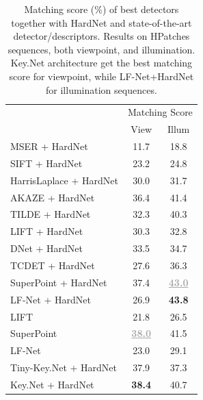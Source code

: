 \begin{table}[!tbh]
\vspace{-0.10cm}
\begin{center}
\begin{tabular}{lcc}
\hline
\noalign{\smallskip}
\multicolumn{1}{c}{} & \multicolumn{2}{c}{Matching Score} \\ 
\cline{2-3} \noalign{\smallskip}
\multicolumn{1}{c}{} & \multicolumn{1}{c}{View} & \multicolumn{1}{c}{Illum} \\
\noalign{\smallskip}
\hline
\noalign{\smallskip}
MSER \cite{MSER} + HardNet \cite{Mishchuk_Mishkin_NIPS17}   & 11.7 & 18.8 \\
SIFT \cite{SIFT} + HardNet \cite{Mishchuk_Mishkin_NIPS17}   & 23.2 & 24.8 \\
HarrisLaplace \cite{HarrisLaplace} + HardNet \cite{Mishchuk_Mishkin_NIPS17} & 30.0 & 31.7 \\
AKAZE \cite{AKAZE} + HardNet \cite{Mishchuk_Mishkin_NIPS17} & 36.4 & 41.4 \\
TILDE \cite{TILDE} + HardNet \cite{Mishchuk_Mishkin_NIPS17} & 32.3 & 40.3 \\
LIFT \cite{LIFT} + HardNet \cite{Mishchuk_Mishkin_NIPS17} & 30.3 & 32.8 \\
DNet \cite{Karel_Vedaldi_ECCV_16} + HardNet \cite{Mishchuk_Mishkin_NIPS17} & 33.5 & 34.7 \\
TCDET \cite{Zhang_Felix_CVPR_17} + HardNet \cite{Mishchuk_Mishkin_NIPS17} & 27.6 & 36.3 \\
SuperPoint \cite{detone2017superpoint} + HardNet \cite{Mishchuk_Mishkin_NIPS17} & 37.4 & \textbf{\textcolor{darkgray}{\underline{43.0}}} \\
LF-Net \cite{OnoSerra18} + HardNet \cite{Mishchuk_Mishkin_NIPS17} & 26.9 & \textbf{43.8} \\
\noalign{\smallskip}
\hline
\noalign{\smallskip}
LIFT \cite{LIFT} & 21.8 & 26.5 \\
SuperPoint \cite{detone2017superpoint} & \textbf{\textcolor{darkgray}{\underline{38.0}}} & 41.5 \\
LF-Net \cite{OnoSerra18} & 23.0 & 29.1 \\
\noalign{\smallskip}
\hline
\noalign{\smallskip}
Tiny-Key.Net + HardNet \cite{Mishchuk_Mishkin_NIPS17} & 37.9 & 37.3 \\
Key.Net + HardNet \cite{Mishchuk_Mishkin_NIPS17}      & \textbf{38.4} & 40.7 \\
\end{tabular}
\caption{Matching score (\%) of best detectors together with HardNet and state-of-the-art detector/descriptors. Results on HPatches sequences, both viewpoint, and illumination. Key.Net architecture get the best matching score for viewpoint, while LF-Net+HardNet for illumination sequences.}
\label{table:matchingScore}
\end{center}
\end{table}


